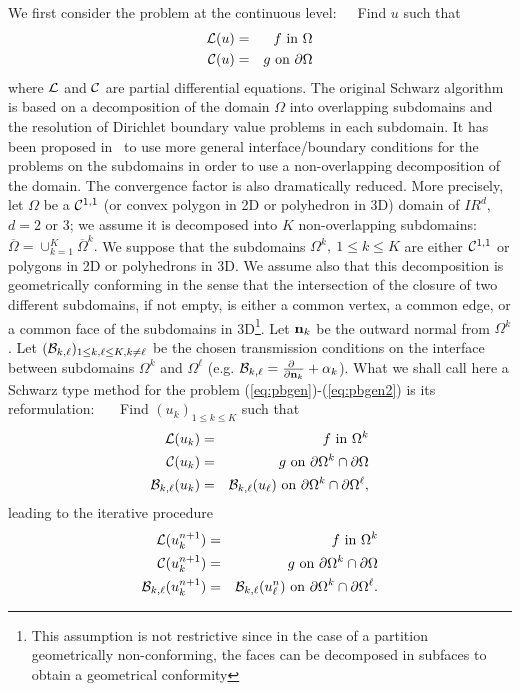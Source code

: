 \documentclass[final]{siamltex}
\begin{document}
We first consider the problem at the continuous level:\ \ \ Find $u$
such that
\begin{eqnarray}
\label{eq:pbgen}
{\cal L}(u)&=&f \hbox{ in }\Omega\\
\label{eq:pbgen2}
{\cal C}(u)&=&g  \hbox{ on }\partial\Omega
\end{eqnarray}
where ${\cal L}$ and ${\cal C}$ are partial differential equations.
The original Schwarz algorithm is based on a decomposition of the
domain $\Omega$ into overlapping subdomains and the resolution of
Dirichlet boundary value problems in each subdomain. It has been
proposed in~\cite{Lions} to use more general interface/boundary conditions for
the problems on the subdomains in order to use a non-overlapping
decomposition of the domain. The convergence factor is also dramatically
reduced.
More precisely, let $\Omega$ be a ${\cal C}^{1,1}$ (or convex polygon
in 2D or polyhedron in 3D) domain of $I\!\!R^d$, $d=2$ or $3$; we
assume it is decomposed into $K$ non-overlapping subdomains:
$
\overline \Omega = \cup_{k=1}^{K} \overline\Omega^k.
$
We suppose that the subdomains $\Omega^k, \ 1 \le k \le K$ are either
${\cal C}^{1,1}$ or polygons in 2D or polyhedrons in 3D. We
assume also that this decomposition is geometrically conforming in the
sense that the intersection of the closure of two different
subdomains, if not empty, is either a common vertex, a common edge, or
a common face of the subdomains in 3D\footnote[1]{This assumption is not restrictive since in the case of
a partition geometrically non-conforming, the faces can be decomposed in
subfaces to obtain a geometrical conformity }.
Let ${{\bf n}}_k$ be the outward normal from
$\Omega^k$. Let $({\cal B}_{k,\ell})_{1\le k,\ell \le K, k\not= \ell}$
be the chosen transmission conditions on the interface between 
subdomains $\Omega^k$ and $\Omega^\ell$ (e.g. ${\cal B}_{k,\ell}={\partial\ \over \partial
  {{\bf n}}_k}+\alpha_k$).  What we shall call here a Schwarz type method for
the problem (\ref{eq:pbgen})-(\ref{eq:pbgen2}) is its reformulation:
\ \ \ Find $(u_k)_{1\le k\le K}$ such that
\begin{eqnarray}
{\cal L}(u_k)&=&f \hbox{ in }\Omega^k \nonumber\\
{\cal C}(u_k)&=&g  \hbox{ on } \partial\Omega^k \cap \partial\Omega \nonumber\\
{\cal B}_{k,\ell}(u_k)&=&{\cal B}_{k,\ell}(u_\ell)
\hbox{ on }\partial\Omega^k \cap \partial\Omega^\ell, \nonumber
\end{eqnarray}
leading to the iterative procedure
\begin{eqnarray}
{\cal L}(u_k^{n+1})&=&f \hbox{ in }\Omega^k \nonumber\\
{\cal C}(u_k^{n+1})&=&g  \hbox{ on } \partial\Omega^k \cap \partial\Omega \nonumber\\
{\cal B}_{k,\ell}(u_k^{n+1})&=&{\cal B}_{k,\ell}(u_\ell^{n})
\hbox{ on }\partial\Omega^k \cap \partial\Omega^\ell. \nonumber
\end{eqnarray}
\end{document}
